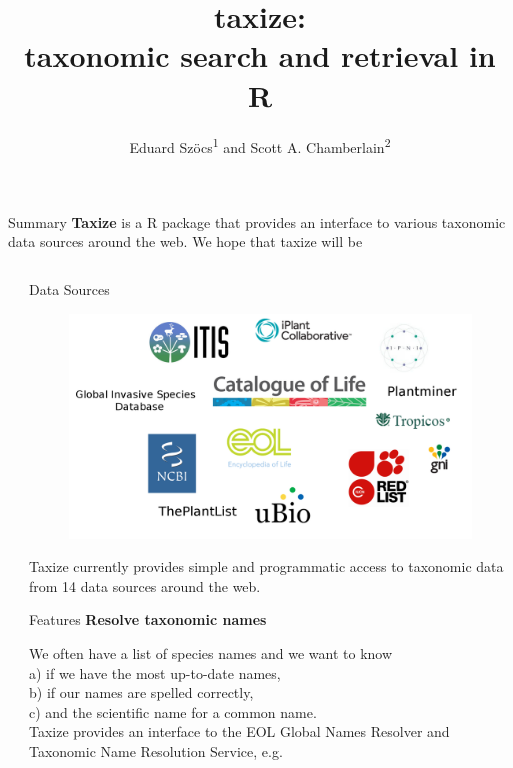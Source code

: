 \documentclass[final,t]{beamer}\usepackage[]{graphicx}\usepackage[]{color}
\title{taxize: \\[0.2em] taxonomic search and retrieval in R}
\author{Eduard Szöcs\textsuperscript{1} and Scott A. Chamberlain\textsuperscript{2}}
\institute{\textsuperscript{1}University of Koblenz-Landau, \textsuperscript{2}Simon Fraser University}
\begin{document}
  \begin{frame}[fragile]

		\begin{block}{Summary}
    \large \textcolor{i6bluedark}{\textbf{Taxize}} is a R package that provides an interface to various taxonomic data sources around the web.
    We hope that taxize will be
		\end{block}

	\begin{columns}[t]
		\begin{column}{0.01\linewidth}
		\end{column}

		\begin{column}{.49\linewidth}
			\vspace{-\baselineskip}  %
			\begin{block}{Data Sources}
				\begin{figure}
					\includegraphics[width=0.8\linewidth]{fig/sources.png}
					\label{fig:sources}
				\end{figure}
        Taxize currently provides simple and programmatic access to taxonomic data from 14 data sources around the web.
			\end{block}

			\begin{block}{Features}
				\textcolor{i6bluedark}{\textbf{\large Resolve taxonomic names}}
        \vspace{0.5em}
        \par
        \begingroup
        \leftskip=2cm
        \noindent 
          We often have a list of species names and we want to know \\
          a) if we have the most up-to-date names, \\
          b) if our names are spelled correctly,  \\
          c) and the scientific name for a common name.\\
          Taxize provides an interface to the EOL Global Names Resolver and Taxonomic Name Resolution Service, e.g.
        \par
        \endgroup


\end{block}
\end{column}
\end{columns}
\end{frame}
\end{document}
